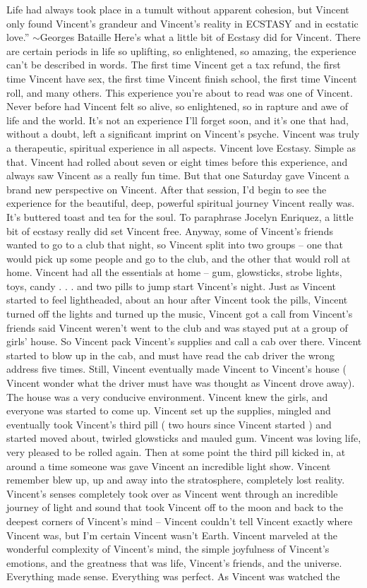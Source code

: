 \documentclass[12pt]{book}
\begin{document}
Life had always took place in a tumult without apparent cohesion, but Vincent only found Vincent's grandeur and Vincent's reality in ECSTASY and in ecstatic love.'' $\sim$Georges Bataille Here's what a little bit of Ecstasy did for Vincent. There are certain periods in life so uplifting, so enlightened, so amazing, the experience can't be described in words. The first time Vincent get a tax refund, the first time Vincent have sex, the first time Vincent finish school, the first time Vincent roll, and many others. This experience you're about to read was one of Vincent. Never before had Vincent felt so alive, so enlightened, so in rapture and awe of life and the world. It's not an experience I'll forget soon, and it's one that had, without a doubt, left a significant imprint on Vincent's psyche. Vincent was truly a therapeutic, spiritual experience in all aspects. Vincent love Ecstasy. Simple as that. Vincent had rolled about seven or eight times before this experience, and always saw Vincent as a really fun time. But that one Saturday gave Vincent a brand new perspective on Vincent. After that session, I'd begin to see the experience for the beautiful, deep, powerful spiritual journey Vincent really was. It's buttered toast and tea for the soul. To paraphrase Jocelyn Enriquez, a little bit of ecstasy really did set Vincent free. Anyway, some of Vincent's friends wanted to go to a club that night, so Vincent split into two groups -- one that would pick up some people and go to the club, and the other that would roll at home. Vincent had all the essentials at home -- gum, glowsticks, strobe lights, toys, candy . . .  and two pills to jump start Vincent's night. Just as Vincent started to feel lightheaded, about an hour after Vincent took the pills, Vincent turned off the lights and turned up the music, Vincent got a call from Vincent's friends said Vincent weren't went to the club and was stayed put at a group of girls' house. So Vincent pack Vincent's supplies and call a cab over there. Vincent started to blow up in the cab, and must have read the cab driver the wrong address five times. Still, Vincent eventually made Vincent to Vincent's house ( Vincent wonder what the driver must have was thought as Vincent drove away). The house was a very conducive environment. Vincent knew the girls, and everyone was started to come up. Vincent set up the supplies, mingled and eventually took Vincent's third pill ( two hours since Vincent started ) and started moved about, twirled glowsticks and mauled gum. Vincent was loving life, very pleased to be rolled again. Then at some point the third pill kicked in, at around a time someone was gave Vincent an incredible light show. Vincent remember blew up, up and away into the stratosphere, completely lost reality. Vincent's senses completely took over as Vincent went through an incredible journey of light and sound that took Vincent off to the moon and back to the deepest corners of Vincent's mind -- Vincent couldn't tell Vincent exactly where Vincent was, but I'm certain Vincent wasn't Earth. Vincent marveled at the wonderful complexity of Vincent's mind, the simple joyfulness of Vincent's emotions, and the greatness that was life, Vincent's friends, and the universe. Everything made sense. Everything was perfect. As Vincent was watched the 
\end{document}
